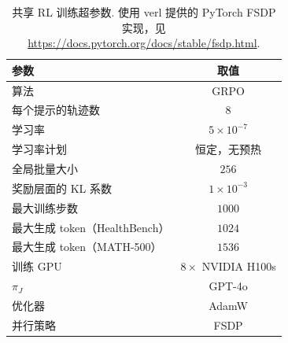 \begin{longtable}{lc}
\caption{共享 RL 训练超参数. 使用 verl 提供的 PyTorch FSDP 实现，见 \url{https://docs.pytorch.org/docs/stable/fsdp.html}.}\label{cat-tab:RLtrainingparams}\\

        \toprule
        参数 & 取值 \\
        \midrule
        算法 & GRPO \cite{cat-shao2024deepseekmath} \\
        每个提示的轨迹数 & 8 \\
        学习率 & $5\times10^{-7}$ \\
        学习率计划 & 恒定，无预热 \\
        全局批量大小 & $256$ \\
        奖励层面的 KL 系数 & $1 \times 10^{-3}$ \\
        最大训练步数 & $1000$ \\
        最大生成 token（HealthBench） & $1024$ \\
        最大生成 token（MATH-500） & $1536$ \\
        训练 GPU & $8 \times$ NVIDIA H100s \\
        $\pi_J$ & GPT-4o \cite{cat-hurst2024gpt} \\
        优化器 & AdamW \cite{cat-loschilov2019decoupled} \\
        并行策略 & FSDP \cite{cat-rajbhandari2020zero} \\
        \bottomrule
    
\end{longtable}
